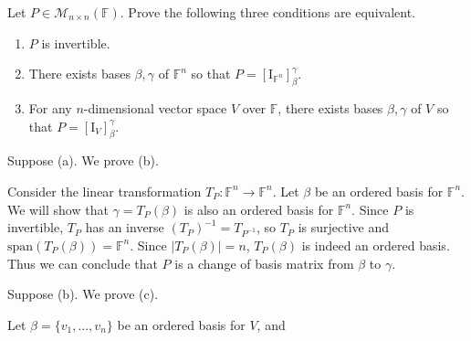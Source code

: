 \documentclass{eh-homework}
\begin{document}
    \begin{question}{8}
        Let \( P \in \mathcal{M}_{n \times n}(\mathbb{F}) \). Prove the following three conditions are equivalent.

        \begin{enumerate}[label=(\alph*)]
            \item \( P \) is invertible.
            \item There exists bases \( \beta, \gamma \) of \( \mathbb{F}^n \) so that \( P = [\mathrm{I}_{\mathbb{F}^n}]_\beta^\gamma \).
            \item For any \( n \)-dimensional vector space \( V \) over \( \mathbb{F} \), there exists bases \( \beta, \gamma \) of \( V \) so that \( P = [\mathrm{I}_V]_\beta^\gamma \).
        \end{enumerate}
        \tcblower

        Suppose (a). We prove (b).

        Consider the linear transformation \(T_P : \mathbb{F}^n \to \mathbb{F}^n\). Let \(\beta\) be an ordered basis for \(\mathbb{F}^n\). We will show that \(\gamma = T_P(\beta)\) is also an ordered basis for \(\mathbb{F}^n\). Since \(P\) is invertible, \(T_P\) has an inverse \((T_P)^{-1} = T_{P^{-1}}\), so \(T_P\) is surjective and \(\mathrm{span} (T_P(\beta)) = \mathbb{F}^n\). Since \(|T_P(\beta)| = n\), \(T_P(\beta)\) is indeed an ordered basis. Thus we can conclude that \(P\) is a change of basis matrix from \(\beta\) to \(\gamma\).

        \medskip

        Suppose (b). We prove (c).

        Let \(\beta = \{ v_1, ..., v_n \}\) be an ordered basis for \(V\), and
    \end{question}
\end{document}
